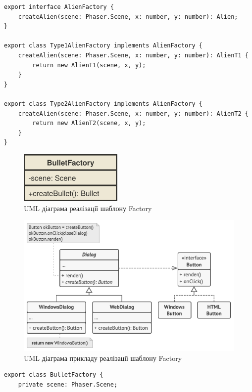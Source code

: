\documentclass[oneside,14pt]{extarticle}
\begin{document}
\begin{normalsize}
	\begin{small}
		\begin{lstlisting}
export interface AlienFactory {
	createAlien(scene: Phaser.Scene, x: number, y: number): Alien;
}

export class Type1AlienFactory implements AlienFactory {
	createAlien(scene: Phaser.Scene, x: number, y: number): AlienT1 {
		return new AlienT1(scene, x, y);
	}
}

export class Type2AlienFactory implements AlienFactory {
	createAlien(scene: Phaser.Scene, x: number, y: number): AlienT2 {
		return new AlienT2(scene, x, y);
	}
}
		\end{lstlisting}
	\end{small}
	
	\begin{figure}[H]
		\centering
		\includegraphics[]{factory}
		\caption{UML діаграма реалізації шаблону Factory}
	\end{figure}
	
		\begin{figure}[H]
		\centering
		\includegraphics[width=\textwidth]{factory-ex}
		\caption{UML діаграма прикладу реалізації шаблону Factory}
	\end{figure}
	
	\begin{small}
		\begin{lstlisting}
export class BulletFactory {
	private scene: Phaser.Scene;
	

\end{lstlisting}
\end{small}
\end{normalsize}
\end{document}
